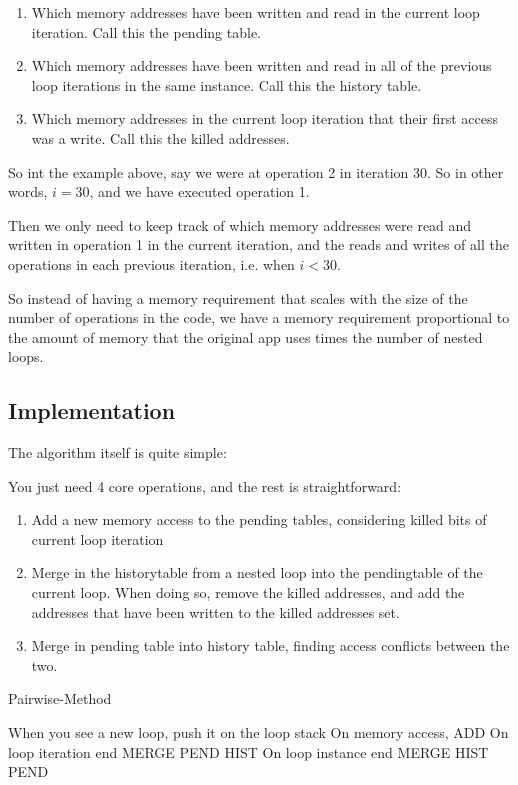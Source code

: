 \documentclass[12pt,twoside]{reedthesis}
\begin{document}
		\begin{enumerate}
			\item Which memory addresses have been written and read in the current loop iteration. Call this the pending table. 
			\item Which memory addresses have been written and read in all of the previous loop iterations in the same instance. Call this the history table.
			\item Which memory addresses in the current loop iteration that their first access was a write. Call this the killed addresses. 
		\end{enumerate}
		
		So int the example above, say we were at operation 2 in iteration 30. So in other words, $i=30$, and we have executed operation 1. 
		
		Then we only need to keep track of which memory addresses were read and written in operation 1 in the current iteration, and the reads and writes of all the operations in each previous iteration, i.e. when $i < 30$. 
		
		So instead of having a memory requirement that scales with the size of the number of operations in the code, we have a memory requirement proportional to the amount of memory that the original app uses times the number of nested loops.
		
		\subsection{Implementation}
		
		The algorithm itself is quite simple:
		
		You just need 4 core operations, and the rest is straightforward:
		
		\begin{enumerate}
			\item Add a new memory access to the pending tables, considering killed bits of current loop iteration
			\item Merge in the historytable from a nested loop into the pendingtable of the current loop. When doing so, remove the killed addresses, and add the addresses that have been written to the killed addresses set. 
			\item Merge in pending table into history table, finding access conflicts between the two. 
		\end{enumerate}
		
		\begin{algorithm}
			\caption{Pairwise-Method}\label{pairwise-method}
			\begin{algorithmic}[1]
				\State When you see a new loop, push it on the loop stack
				\State On memory access, \textsc{ADD}
				\State On loop iteration end \textsc{MERGE PEND HIST}
				\State On loop instance end \textsc{MERGE HIST PEND}
			\end{algorithmic}
		\end{algorithm}
		
\end{document}
